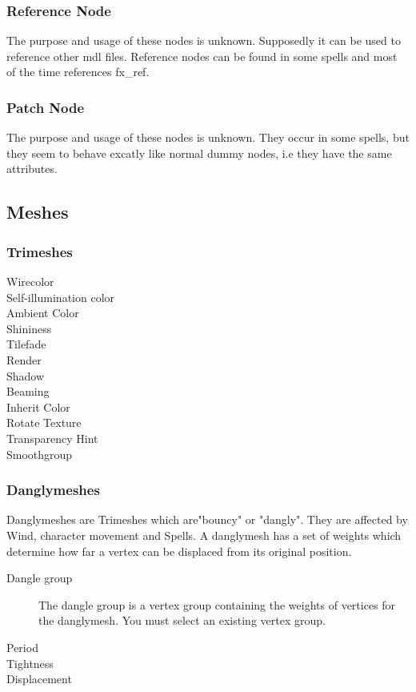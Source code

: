 \subsubsection{Reference Node}
The purpose and usage of these nodes is unknown. Supposedly it can be used to
reference other mdl files. Reference nodes can be found in some spells and
most of the time references fx\_ref.

\subsubsection{Patch Node}
The purpose and usage of these nodes is unknown. They occur in some spells, but
they seem to behave excatly like normal dummy nodes, i.e they have the same
attributes.

\subsection{Meshes}

\subsubsection{Trimeshes}

\begin{description}
    \item[Wirecolor]
    \item[Self-illumination color]
    \item[Ambient Color]
    \item[Shininess]
    \item[Tilefade]
    \item[Render]
    \item[Shadow]
    \item[Beaming]
    \item[Inherit Color]
    \item[Rotate Texture]
    \item[Transparency Hint]
    \item[Smoothgroup]
\end{description}

\subsubsection{Danglymeshes}
Danglymeshes are Trimeshes which are"bouncy" or "dangly". They are affected by
Wind, character movement and Spells. A danglymesh has a set of weights which
determine how far a vertex can be displaced from its original position.
\begin{description}
    \item[Dangle group] The dangle group is a vertex group containing the weights of vertices for the danglymesh. You must select an existing vertex group.
    \item[Period]
    \item[Tightness]
    \item[Displacement]
\end{description}

